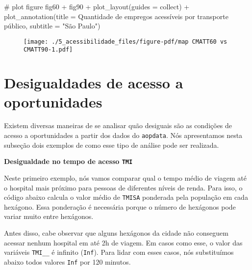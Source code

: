 \documentclass[
  letterpaper,
  DIV=11,
  numbers=noendperiod]{scrreprt}
\newenvironment{Shaded}{\begin{snugshade}}{\end{snugshade}}
\newcommand{\AttributeTok}[1]{\textcolor[rgb]{0.40,0.45,0.13}{#1}}
\newcommand{\CommentTok}[1]{\textcolor[rgb]{0.37,0.37,0.37}{#1}}
\newcommand{\FunctionTok}[1]{\textcolor[rgb]{0.28,0.35,0.67}{#1}}
\newcommand{\NormalTok}[1]{\textcolor[rgb]{0.00,0.23,0.31}{#1}}
\newcommand{\SpecialCharTok}[1]{\textcolor[rgb]{0.37,0.37,0.37}{#1}}
\newcommand{\StringTok}[1]{\textcolor[rgb]{0.13,0.47,0.30}{#1}}
\begin{document}
\begin{Shaded}
\begin{Highlighting}[]
\CommentTok{\# plot figure}
\NormalTok{fig60 }\SpecialCharTok{+}\NormalTok{ fig90 }\SpecialCharTok{+} 
  \FunctionTok{plot\_layout}\NormalTok{(}\AttributeTok{guides =} \StringTok{\textquotesingle{}collect\textquotesingle{}}\NormalTok{) }\SpecialCharTok{+}
  \FunctionTok{plot\_annotation}\NormalTok{(}\AttributeTok{title =} \StringTok{\textquotesingle{}Quantidade de empregos acessíveis por transporte público\textquotesingle{}}\NormalTok{,}
                  \AttributeTok{subtitle =} \StringTok{"São Paulo"}\NormalTok{)}
\end{Highlighting}
\end{Shaded}

\begin{figure}[H]

{\centering \texttt{[image: ./5\_acessibilidade\_files/figure-pdf/map CMATT60 vs CMATT90-1.pdf]}

}

\end{figure}

\hypertarget{desigualdades-de-acesso-a-oportunidades}{%
\section{Desigualdades de acesso a
oportunidades}\label{desigualdades-de-acesso-a-oportunidades}}

Existem diversas maneiras de se analisar quão desiguais são as condições
de acesso a oportunidades a partir dos dados do \texttt{aopdata}. Nós
apresentamos nesta subseção dois exemplos de como esse tipo de análise
pode ser realizada.

\textbf{Desigualdade no tempo de acesso \texttt{TMI}}

Neste primeiro exemplo, nós vamos comparar qual o tempo médio de viagem
até o hospital mais próximo para pessoas de diferentes níveis de renda.
Para isso, o código abaixo calcula o valor médio de \texttt{TMISA}
ponderada pela população em cada hexágono. Essa ponderação é necessária
porque o número de hexágonos pode variar muito entre hexágonos.

Antes disso, cabe observar que alguns hexágonos da cidade não conseguem
acessar nenhum hospital em até 2h de viagem. Em casos como esse, o valor
das variáveis \texttt{TMI\_\_} é infinito (\texttt{Inf}). Para lidar com
esses casos, nós substituímos abaixo todos valores \texttt{Inf} por 120
minutos.
\end{document}
